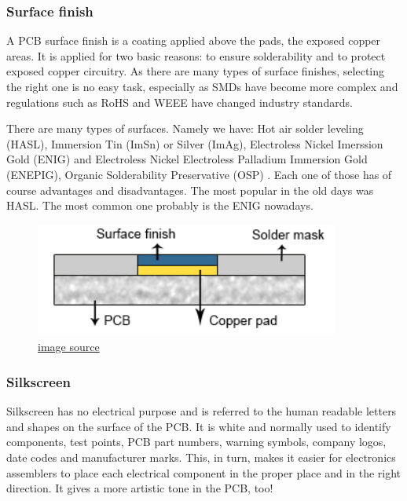 \documentclass[final]{cubedoc}
\begin{document}
	
	\subsubsection{Surface finish}
	
	
	A PCB surface finish is a coating applied above the pads, the exposed copper areas. It is applied for two basic reasons: to ensure solderability and to protect exposed copper circuitry. As there are many types of surface finishes, selecting the right one is no easy task, especially as SMDs have become more complex and regulations such as RoHS and WEEE have changed industry standards.
	
	There are many types of surfaces. Namely we have: Hot air solder leveling (HASL), Immersion Tin (ImSn) or Silver (ImAg), Electroless Nickel Imerssion Gold (ENIG) and Electroless Nickel Electroless Palladium Immersion Gold (ENEPIG), Organic Solderability Preservative (OSP) \cite{pcbway:finsih}. Each one of those has of course advantages and disadvantages. The most popular in the old days was HASL.
	The most common one probably is the ENIG nowadays.
	
	
	\begin{figure}[h!]
		\centering
		\includegraphics[keepaspectratio, height=0.2\textheight, width=.6\textwidth]{assets/surface_finish.png}
		\caption{\href{https://web.archive.org/web/20200814090855/https://www.pcbcart.com/article/content/surface-finish-intro-and-comparision.html}{image source}}
	\end{figure}
	
	\subsubsection{Silkscreen}
	
	Silkscreen has no electrical purpose and is referred to the human readable letters and shapes on the surface of the PCB. It is white and normally used to identify components, test points, PCB part numbers, warning symbols, company logos, date codes and manufacturer marks. This, in turn, makes it easier for electronics assemblers to place each electrical component in the proper place and in the right direction. It gives a more artistic tone in the PCB, too!
	
\end{document}
